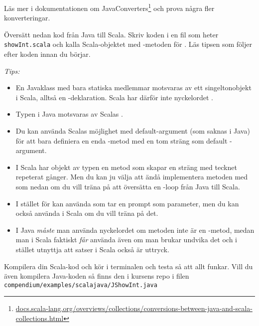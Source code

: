 \Subtask Läs mer i dokumentationen om JavaConverters\footnote{\href{http://docs.scala-lang.org/overviews/collections/conversions-between-java-and-scala-collections.html}{docs.scala-lang.org/overviews/collections/conversions-between-java-and-scala-collections.html}}
och prova några fler konverteringar.


\ExtraTasks %

\Task Översätt nedan kod från Java till Scala. Skriv koden i en fil som heter \texttt{showInt.scala} och kalla Scala-objektet med -metoden för . Läs tipsen som följer efter koden innan du börjar. 


\emph{Tips:}
\begin{itemize}[nolistsep, noitemsep]
\item En Javaklass med bara statiska medlemmar motsvaras av ett singeltonobjekt i Scala, alltså en -deklaration. Scala har därför inte nyckelordet .
\item Typen  i Java motsvaras av Scalas .
\item Du kan använda Scalas möjlighet med default-argument (som saknas i Java) för att bara definiera en enda -metod med en tom sträng som default -argument.
\item I Scala har objekt av typen  en metod  som skapar en sträng med tecknet repeterat  gånger. Men du kan ju välja att ändå implementera metoden  med  som nedan om du vill träna på att översätta en -loop från Java till Scala.
\item I stället för  kan använda  som tar en prompt som parameter, men du kan också använda  i Scala om du vill träna på det.
\item I Java \emph{måste} man använda nyckelordet  om metoden inte är en -metod, medan man i Scala faktiskt \emph{får} använda  även om man brukar undvika det och i stället utnyttja att satser i Scala också är uttryck.
\end{itemize}
Kompilera din Scala-kod och kör i terminalen och testa så att allt funkar. Vill du även kompilera Java-koden så finns den i kursens repo i filen\\ \texttt{compendium/examples/scalajava/JShowInt.java}




